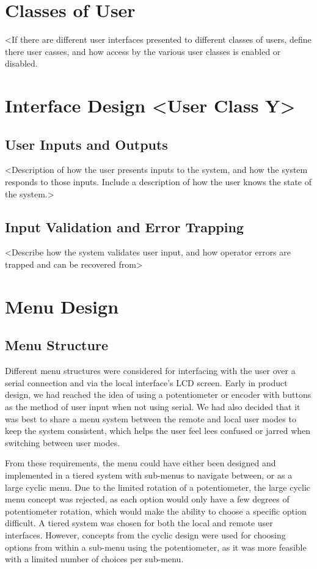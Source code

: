 \documentclass[]{report}
\begin{document}
\section{Classes of User}
<If there are different user interfaces presented to different classes of users, define there user casses, and how access by the various user classes is enabled or disabled.

\section{Interface Design <User Class Y>}
\subsection{User Inputs and Outputs}
<Description of how the user presents inputs to the system, and how the system responds to those inputs. Include a description of how the user knows the state of the system.>

\subsection{Input Validation and Error Trapping}
<Describe how the system validates user input, and how operator errors are trapped and can be recovered from>

\section{Menu Design}
\subsection{Menu Structure}
Different menu structures were considered for interfacing with the user over a serial connection and via the local interface's LCD screen. Early in product design, we had reached the idea of using a potentiometer or encoder with buttons as the method of user input when not using serial. We had also decided that it was best to share a menu system between the remote and local user modes to keep the system consistent, which helps the user feel lees confused or jarred when switching between user modes. 


From these requirements, the menu could have either been designed and implemented in a tiered system with sub-menus to navigate between, or as a large cyclic menu. Due to the limited rotation of a potentiometer, the large cyclic menu concept was rejected, as each option would only have a few degrees of potentiometer rotation, which would make the ability to choose a specific option difficult. A tiered system was chosen for both the local and remote user interfaces. However, concepts from the cyclic design were used for choosing options from within a sub-menu using the potentiometer, as it was more feasible with a limited number of choices per sub-menu. 
\end{document}
